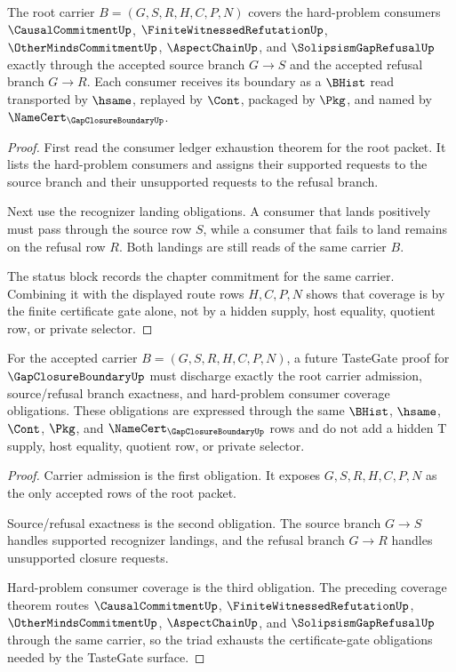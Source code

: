 \begin{theorem}
\label{thm:gap-closure-boundary-hard-problem-consumer-coverage}
The root carrier $B=(G,S,R,H,C,P,N)$ covers the hard-problem consumers $\CausalCommitmentUp$, $\FiniteWitnessedRefutationUp$, $\OtherMindsCommitmentUp$, $\AspectChainUp$, and $\SolipsismGapRefusalUp$ exactly through the accepted source branch $G \longrightarrow S$ and the accepted refusal branch $G \longrightarrow R$. Each consumer receives its boundary as a $\BHist$ read transported by $\hsame$, replayed by $\Cont$, packaged by $\Pkg$, and named by $\NameCert_{\GapClosureBoundaryUp}$.
\end{theorem}
\begin{proof}
First read the consumer ledger exhaustion theorem for the root packet. It lists the hard-problem consumers and assigns their supported requests to the source branch and their unsupported requests to the refusal branch.

Next use the recognizer landing obligations. A consumer that lands positively must pass through the source row $S$, while a consumer that fails to land remains on the refusal row $R$. Both landings are still reads of the same carrier $B$.

The status block records the chapter commitment for the same carrier. Combining it with the displayed route rows $H,C,P,N$ shows that coverage is by the finite certificate gate alone, not by a hidden supply, host equality, quotient row, or private selector.
\end{proof}

\begin{theorem}
\label{thm:gap-closure-boundary-tastegate-obligation-triad}
For the accepted carrier $B=(G,S,R,H,C,P,N)$, a future TasteGate proof for $\GapClosureBoundaryUp$ must discharge exactly the root carrier admission, source/refusal branch exactness, and hard-problem consumer coverage obligations. These obligations are expressed through the same $\BHist$, $\hsame$, $\Cont$, $\Pkg$, and $\NameCert_{\GapClosureBoundaryUp}$ rows and do not add a hidden T supply, host equality, quotient row, or private selector.
\end{theorem}
\begin{proof}
Carrier admission is the first obligation. It exposes $G,S,R,H,C,P,N$ as the only accepted rows of the root packet.

Source/refusal exactness is the second obligation. The source branch $G \longrightarrow S$ handles supported recognizer landings, and the refusal branch $G \longrightarrow R$ handles unsupported closure requests.

Hard-problem consumer coverage is the third obligation. The preceding coverage theorem routes $\CausalCommitmentUp$, $\FiniteWitnessedRefutationUp$, $\OtherMindsCommitmentUp$, $\AspectChainUp$, and $\SolipsismGapRefusalUp$ through the same carrier, so the triad exhausts the certificate-gate obligations needed by the TasteGate surface.
\end{proof}
